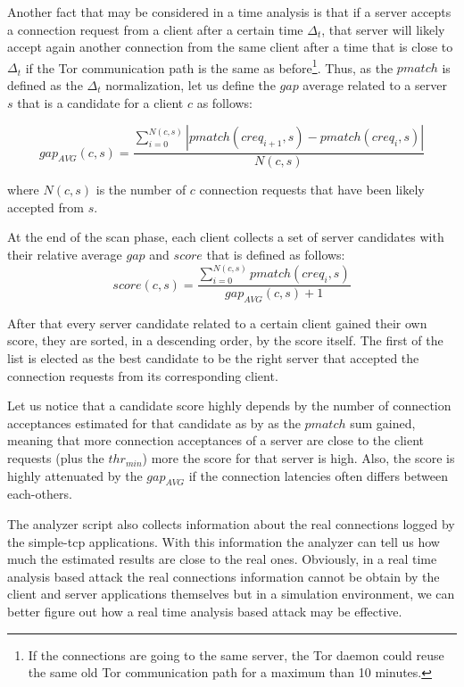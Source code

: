 Another fact that may be considered in a time analysis is that if a server accepts a
connection request from a client after a certain time $\Delta_t$, that
server will likely accept again another connection from the same client
after a time that is close to $\Delta_t$ if the Tor communication path is the same as
before\footnote{If the connections are going to the same server, the Tor
daemon could reuse the same old Tor communication path for a maximum
than 10 minutes\cite{tormanual}.}. 
Thus, as the $pmatch$ is defined as the $\Delta_t$ normalization, 
let us define the $gap$ average related to a
server $s$ that is a candidate for a client $c$ as follows:

\begin{equation}
\label{eq:gap}
 gap_{AVG}(c,s) = \frac{\sum_{i=0}^{N(c,s)} | pmatch(creq_{i+1},s) -
pmatch(creq_{i},s)
|}{N(c,s)}
\end{equation}

where $N(c,s)$ is the number of $c$ connection requests that have been likely
accepted from $s$.


At the end of the scan phase, each client collects a set of server
candidates with their relative average $gap$ and $score$ that is defined
as follows:
\begin{equation}
	score(c,s) = \frac{\sum_{i=0}^{N(c,s)} pmatch(creq_{i},s)}{gap_{AVG}(c,s) + 1}
\end{equation}

After that every server candidate related to a certain client gained
their own score, they are sorted, in a descending order, by the score
itself. The first of the list is elected as the best candidate to be the
right server that accepted the connection requests from its corresponding
client.

Let us notice that a candidate score highly depends by the number of connection
acceptances estimated for that candidate as by as the $pmatch$ sum gained,
meaning that more connection acceptances of a server are close to the client
requests (plus the $thr_{min}$) more the score for that server is high.
Also, the score is highly attenuated by the $gap_{AVG}$ if the connection
latencies often differs between each-others.


The analyzer script also collects information about the
real connections logged by the simple-tcp applications. With this
information the analyzer can tell us how much the estimated results are
close to the real ones. Obviously, in a real time analysis based attack the real connections
information cannot be obtain by the client and server applications themselves 
but in a simulation environment, we can better figure out how a real
time analysis based attack may be effective.

